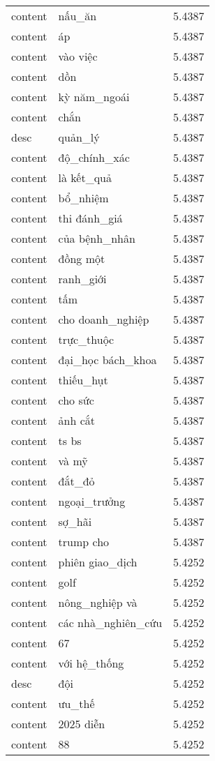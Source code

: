\documentclass{article}
\begin{document}
\begin{tabular}{lll}
content & nấu\_ăn & 5.4387\\
content & áp & 5.4387\\
content & vào việc & 5.4387\\
content & dồn & 5.4387\\
content & kỳ năm\_ngoái & 5.4387\\
content & chắn & 5.4387\\
desc & quản\_lý & 5.4387\\
content & độ\_chính\_xác & 5.4387\\
content & là kết\_quả & 5.4387\\
content & bổ\_nhiệm & 5.4387\\
content & thi đánh\_giá & 5.4387\\
content & của bệnh\_nhân & 5.4387\\
content & đồng một & 5.4387\\
content & ranh\_giới & 5.4387\\
content & tấm & 5.4387\\
content & cho doanh\_nghiệp & 5.4387\\
content & trực\_thuộc & 5.4387\\
content & đại\_học bách\_khoa & 5.4387\\
content & thiếu\_hụt & 5.4387\\
content & cho sức & 5.4387\\
content & ảnh cắt & 5.4387\\
content & ts bs & 5.4387\\
content & và mỹ & 5.4387\\
content & đắt\_đỏ & 5.4387\\
content & ngoại\_trưởng & 5.4387\\
content & sợ\_hãi & 5.4387\\
content & trump cho & 5.4387\\
content & phiên giao\_dịch & 5.4252\\
content & golf & 5.4252\\
content & nông\_nghiệp và & 5.4252\\
content & các nhà\_nghiên\_cứu & 5.4252\\
content & 67 & 5.4252\\
content & với hệ\_thống & 5.4252\\
desc & đội & 5.4252\\
content & ưu\_thế & 5.4252\\
content & 2025 diễn & 5.4252\\
content & 88 & 5.4252\\

\end{tabular}
\end{document}

